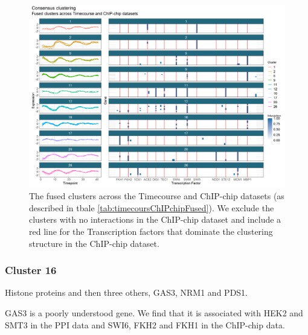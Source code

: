 \documentclass[]{article}
\begin{document}
\begin{figure}
	\centering
	\includegraphics[scale=0.6]{./Images/Yeast/timecourseChIPchipFused.png}
	\caption{The fused clusters across the Timecourse and ChIP-chip datasets (as described in tbale \ref{tab:timecoursChIPchipFused}). We exclude the clusters with no interactions in the ChIP-chip dataset and include a red line for the Transcription factors that dominate the clustering structure in the ChIP-chip dataset.}
	\label{fig:timepointChIPchipFused}
\end{figure}


\subsubsection{Cluster 16}
Histone proteins and then three others, GAS3, NRM1 and PDS1.

GAS3 is a poorly understood gene. We find that it is associated with HEK2 and SMT3 in the PPI data and SWI6, FKH2 and FKH1 in the ChIP-chip data. 

\end{document}
